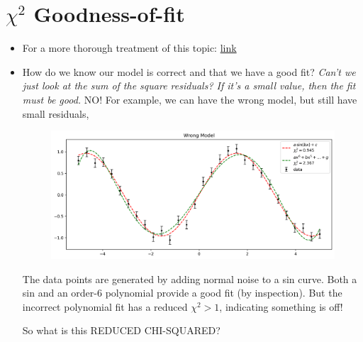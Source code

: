 \documentclass[12pt]{article}
\numberwithin{equation}{section}
\begin{document}
\section{$\chi^2$ Goodness-of-fit}
\begin{itemize}
\item For a more thorough treatment of this topic: \href{https://www.ocf.berkeley.edu/~yizhu/static/notes/Chi%20Squared/chi_squared.pdf}{link}
\item How do we know our model is correct and that we have a good fit? \textit{Can't we just look at the sum of the square residuals? If it's a small value, then the fit must be good.} NO! For example, we can have the wrong model, but still have small residuals, 
\begin{figure}[H]
	\centering
	\includegraphics[width=15cm] {wrong}
\end{figure}
The data points are generated by adding normal noise to a sin curve. Both a sin and an order-6 polynomial provide a good fit (by inspection). But the incorrect polynomial fit has a reduced $ \chi^2 >1$, indicating something is off!

So what is this REDUCED CHI-SQUARED?


\end{itemize}
\end{document}
